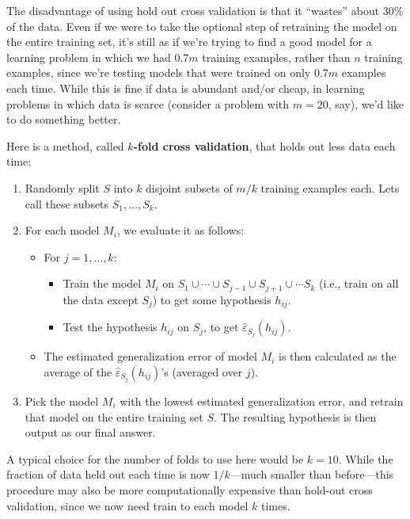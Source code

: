 The disadvantage of using hold out cross validation is that it ``wastes''
about $30\%$ of the data. Even if we were to take the optional step of retraining
the model on the entire training set, it's still as if we're trying to find a good
model for a learning problem in which we had 0.7$m$ training examples, rather
than $n$ training examples, since we're testing models that were trained on
only 0.7$m$ examples each time. While this is fine if data is abundant and/or
cheap, in learning problems in which data is scarce (consider a problem with
$m = 20$, say), we'd like to do something better.

Here is a method, called $k$\textbf{-fold cross validation}, that holds out less
data each time:
\begin{enumerate}
    \item Randomly split $S$ into $k$ disjoint subsets of $m/k$ training examples each. Lets call these subsets $S_1,\ldots,S_k$.
    \item For each model $M_i$, we evaluate it as follows:
    \begin{itemize}
        \item For $j=1,\ldots,k$:
        \begin{itemize}
            \item Train the model $M_i$ on $S_1 \cup \cdots \cup S_{j-1} \cup S_{j+1} \cup \cdots S_k$ (i.e., train on all the data except $S_j$) to get some hypothesis $h_{ij}$.
            \item Test the hypothesis $h_{ij}$ on $S_j$, to get $\hat{\varepsilon}_{S_j}(h_{ij})$.
        \end{itemize}
        \item The estimated generalization error of model $M_i$ is then calculated as the average of the $\hat{\varepsilon}_{S_j} (h_{ij})$'s (averaged over $j$).
    \end{itemize}
    \item Pick the model $M_i$ with the lowest estimated generalization error, and retrain that model on the entire training set $S$. The resulting hypothesis is then output as our final answer.
\end{enumerate}

A typical choice for the number of folds to use here would be $k = 10$.
While the fraction of data held out each time is now $1/k$---much smaller
than before---this procedure may also be more computationally expensive
than hold-out cross validation, since we now need train to each model $k$
times.

